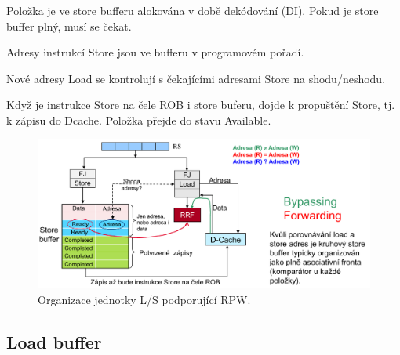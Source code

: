 \begin{compactitem}
    \item Položka je ve store bufferu alokována v době dekódování (DI). Pokud je store buffer plný, musí se čekat.
    \item Adresy instrukcí Store jsou ve bufferu v programovém pořadí.
    \item Nové adresy Load se kontrolují s čekajícími adresami Store na shodu/neshodu.
    \item Když je instrukce Store na čele ROB i store buferu, dojde k propuštění Store, tj. k zápisu do Dcache. Položka přejde do stavu Available.

    \begin{figure}[H]
        \centering
        \includegraphics[width=1\linewidth]{store_buffer.pdf}
        \caption{Organizace jednotky L/S podporující RPW.}
    \end{figure}
\end{compactitem}

\subsection{Load buffer}

